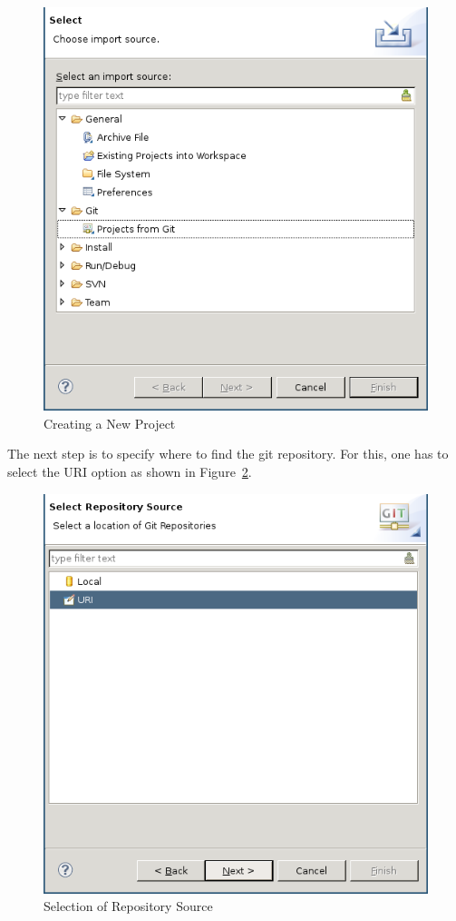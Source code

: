 \documentclass{template/openetcs_article}
\begin{document}
\begin{figure}[H]
  \centering
  \includegraphics[width=\skalierung\textwidth]{project_import_step1}
  \caption{Creating a New Project}
  \label{fig:create-new-project}
\end{figure}

The next step is to specify where to find the git repository. For this, one has
to select the URI option as shown in Figure~\ref{fig:select-repo-source}.

\begin{figure}[H]
  \centering
  \includegraphics[width=\skalierung\textwidth]{project_import_step2}
  \caption{Selection of Repository Source}
  \label{fig:select-repo-source}
\end{figure}
\end{document}
